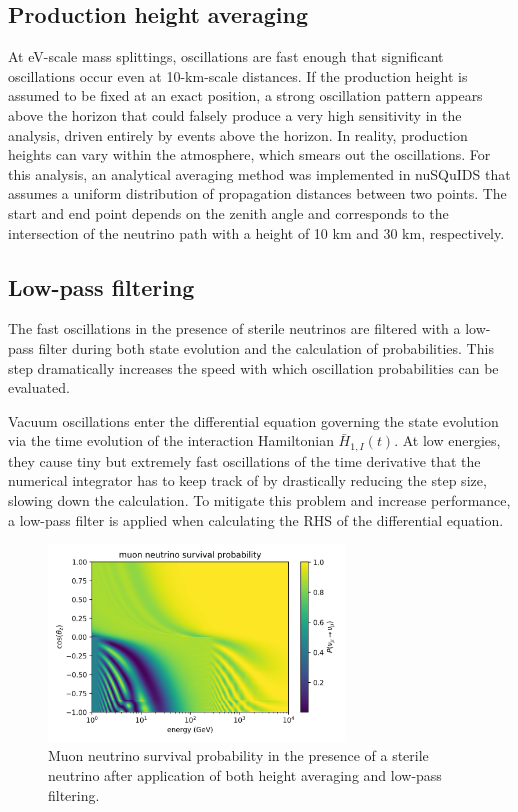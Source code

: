 \subsection{Production height averaging}
At eV-scale mass splittings, oscillations are fast enough that significant oscillations occur even at 10-km-scale distances. If the production height is assumed to be fixed at an exact position, a strong oscillation pattern appears above the horizon that could falsely produce a very high sensitivity in the analysis, driven entirely by events above the horizon. In reality, production heights can vary within the atmosphere, which smears out the oscillations. For this analysis, an analytical averaging method was implemented in nuSQuIDS that assumes a uniform distribution of propagation distances between two points. The start and end point depends on the zenith angle and corresponds to the intersection of the neutrino path with a height of 10 km and 30 km, respectively.

\subsection{Low-pass filtering}
\label{sec:low-pass-filtering}
The fast oscillations in the presence of sterile neutrinos are filtered with a low-pass filter during both state evolution and the calculation of probabilities. This step dramatically increases the speed with which oscillation probabilities can be evaluated.

Vacuum oscillations enter the differential equation governing the state evolution via the time evolution of the interaction Hamiltonian $\bar{H}_{1, I}(t)$. At low energies, they cause tiny but extremely fast oscillations of the time derivative that the numerical integrator has to keep track of by drastically reducing the step size, slowing down the calculation. To mitigate this problem and increase performance, a low-pass filter is applied when calculating the RHS of the differential equation.

\begin{figure}
    \centering
    \includegraphics[width=0.7\textwidth]{figures/measurement/sterile_analysis/nusquids/Dm41_0.5eV2_th24_15deg_avg_height_10-30km_lp_belowhor.png}
    \caption{Muon neutrino survival probability in the presence of a sterile neutrino after application of both height averaging and low-pass filtering.}
    \label{fig:nusquids-low-pass-filtering}
\end{figure}

